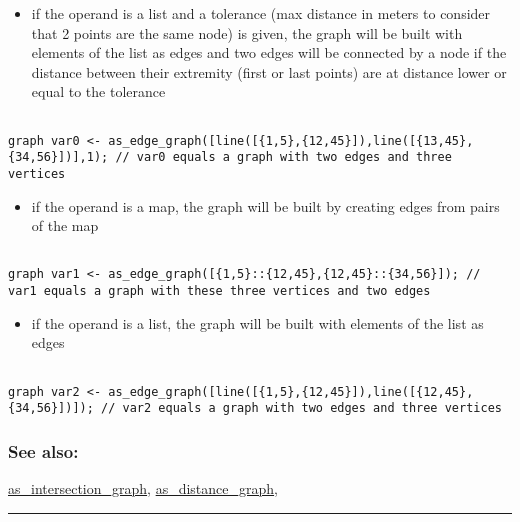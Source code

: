 \documentclass[]{book}
\providecommand{\tightlist}{%
  \setlength{\itemsep}{0pt}\setlength{\parskip}{0pt}}
\theoremstyle{definition}
\theoremstyle{definition}
\theoremstyle{definition}
\theoremstyle{remark}
\begin{document}
\begin{itemize}
\tightlist
\item
  if the operand is a list and a tolerance (max distance in meters to
  consider that 2 points are the same node) is given, the graph will be
  built with elements of the list as edges and two edges will be
  connected by a node if the distance between their extremity (first or
  last points) are at distance lower or equal to the tolerance
\end{itemize}

\begin{verbatim}
 
graph var0 <- as_edge_graph([line([{1,5},{12,45}]),line([{13,45},{34,56}])],1); // var0 equals a graph with two edges and three vertices
\end{verbatim}

\begin{itemize}
\tightlist
\item
  if the operand is a map, the graph will be built by creating edges
  from pairs of the map
\end{itemize}

\begin{verbatim}
 
graph var1 <- as_edge_graph([{1,5}::{12,45},{12,45}::{34,56}]); // var1 equals a graph with these three vertices and two edges
\end{verbatim}

\begin{itemize}
\tightlist
\item
  if the operand is a list, the graph will be built with elements of the
  list as edges
\end{itemize}

\begin{verbatim}
 
graph var2 <- as_edge_graph([line([{1,5},{12,45}]),line([{12,45},{34,56}])]); // var2 equals a graph with two edges and three vertices
\end{verbatim}

\subsubsection{See also:}\label{see-also-32}

\href{operators-a-to-a.html\#as_intersection_graph}{as\_intersection\_graph},
\href{operators-a-to-a.html\#as_distance_graph}{as\_distance\_graph},

\begin{center}\rule{0.5\linewidth}{\linethickness}\end{center}
\end{document}
